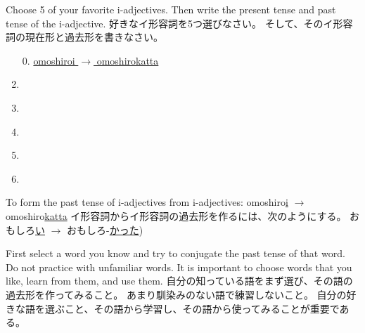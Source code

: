 \documentclass[uplatex,dvipdfmx,b5paper,english,10pt]{jsbook}
\begin{document}

\begin{toiquestion}
\ifEnglish
Choose 5 of your favorite i-adjectives.
Then write the present tense and past tense of the i-adjective.
\else
好きなイ形容詞を5つ選びなさい。
そして、そのイ形容詞の現在形と過去形を書きなさい。
\fi

\begin{enumerate}
  \item[0.] \underline{\hspace{.0zw}omoshiroi $\rightarrow$ omoshirokatta\hspace{.0zw}}
  \item \underline{\hspace{23zw}}
  \item \underline{\hspace{23zw}}
  \item \underline{\hspace{23zw}}
  \item \underline{\hspace{23zw}}
  \item \underline{\hspace{23zw}}
\end{enumerate}
\end{toiquestion}

\begin{note}
\ifEnglish
To form the past tense of i-adjectives from i-adjectives:
omoshiro\underline{i} $\rightarrow$ omoshiro\underline{katta}
\else
イ形容詞からイ形容詞の過去形を作るには、次のようにする。
おもしろ\underline{い} $\rightarrow$ おもしろ-\underline{かった})
\fi
\end{note}

\begin{toianswer}
\ifEnglish
First select a word you know and try to conjugate the past tense of that word.
Do not practice with unfamiliar words.
It is important to choose words that you like, learn from them, and use them.
\else
自分の知っている語をまず選び、その語の過去形を作ってみること。
あまり馴染みのない語で練習しないこと。
自分の好きな語を選ぶこと、その語から学習し、その語から使ってみることが重要である。
\fi
\end{toianswer}
\end{document}
